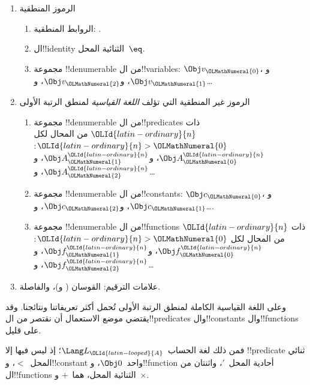 \documentclass[../../../include/open-logic-section]{subfiles}
\begin{document}
\begin{enumerate}
\item الرموز المنطقية
\begin{enumerate}
\item الروابط المنطقية:
  \startycommalist
  .
\item ال!!{identity} الثنائية المحل~$\eq$.
\item مجموعة !!{denumerable} من ال!!{variable}s: $\Obj v_\OLMathNumeral{0}$، و$\Obj v_\OLMathNumeral{1}$، و$\Obj
  v_\OLMathNumeral{2}$، و\dots
\end{enumerate}
\item الرموز غير المنطقية التي تؤلف \emph{اللغة القياسية} لمنطق
  الرتبة الأولى
\begin{enumerate}
\item مجموعة !!{denumerable} من ال!!{predicate}s ذات $\OLId{latin-ordinary}{n}$ من المحال لكل
  $\OLId{latin-ordinary}{n}>\OLMathNumeral{0}$: $\Obj A^\OLId{latin-ordinary}{n}_\OLMathNumeral{0}$، و$\Obj A^\OLId{latin-ordinary}{n}_\OLMathNumeral{1}$، و$\Obj A^\OLId{latin-ordinary}{n}_\OLMathNumeral{2}$، و\dots
\item مجموعة !!{denumerable} من ال!!{constant}s: $\Obj c_\OLMathNumeral{0}$، و$\Obj c_\OLMathNumeral{1}$، و$\Obj
  c_\OLMathNumeral{2}$، و\dots.
\item مجموعة !!{denumerable} من ال!!{function}s ذات $\OLId{latin-ordinary}{n}$ من المحال لكل
  $\OLId{latin-ordinary}{n}>\OLMathNumeral{0}$: $\Obj f^\OLId{latin-ordinary}{n}_\OLMathNumeral{0}$، و$\Obj f^\OLId{latin-ordinary}{n}_\OLMathNumeral{1}$، و$\Obj f^\OLId{latin-ordinary}{n}_\OLMathNumeral{2}$، و\dots
\end{enumerate}
\item علامات الترقيم: القوسان ( و)، والفاصلة.
\end{enumerate}

وعلى اللغة القياسية الكاملة لمنطق الرتبة الأولى تُحمل أكثر
تعريفاتنا ونتائجنا. وقد يقتضي موضع الاستعمال أن نقتصر من
ال!!{predicate}s وال!!{constant}s وال!!{function}s على قليل.

\begin{ex}
فمن ذلك لغة الحساب~$\Lang L_\OLId{latin-looped}{A}$؛ إذ ليس فيها إلا !!{predicate}
ثنائي المحل~$<$، و!!{constant} واحد~$\Obj 0$، و!!{function}
أحادية المحل~$\prime$، واثنتان من ال!!{function}s الثنائية المحل، هما~$+$ و~$\times$.
\end{ex}
\end{document}
